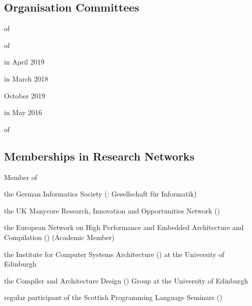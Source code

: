 \subsection{Organisation Committees}
\begin{cvitemize}
    \item {} of
        \begin{inlineItemize}
            \item {}
            \item {}
            \item {}
        \end{inlineItemize}
    \item {} of
        \begin{inlineItemize}
            \item {} in April 2019
            \item {} in March 2018
            \item October 2019
            \item {} in May 2016
        \end{inlineItemize}
    \item {} of
        \begin{inlineItemize}
            \item {}
        \end{inlineItemize}
\end{cvitemize}


\subsection{Memberships in Research Networks}
\begin{cvitemize}
    \item Member of
      \begin{inlineItemize}
        \item {}
        \item the German Informatics Society (\@: {\footnotesize Gesellschaft f{\"u}r Informatik})
        \item the UK Manycore Research, Innovation and Opportunities Network ()
        \item the European Network on High Performance and Embedded Architecture and Compilation () (Academic Member)
        \item the Institute for Computer Systems Architecture () at the University of Edinburgh
        \item the Compiler and Architecture Design () Group at the University of Edinburgh
        \item regular participant of the Scottish Programming Language Seminars ()
      \end{inlineItemize}
\end{cvitemize}

